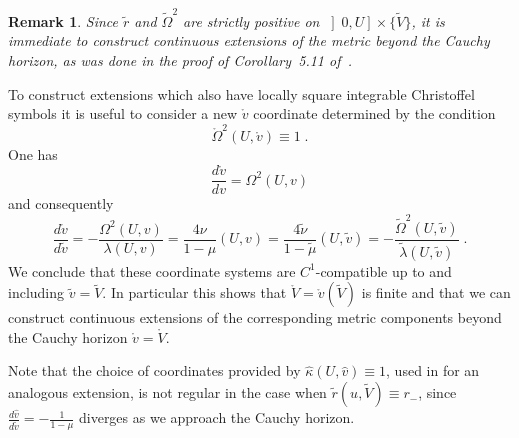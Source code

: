 \documentclass[a4paper,11pt,oneside,reqno]{amsart}
\newtheorem{Rmk}[Thm]{Remark}
\newcommand{\mv}{\mathring{v}}
\begin{document}
\begin{Rmk}
Since $\tilde r$ and $\tilde{\Omega}^2$ are strictly positive on $\left]0,U\right]\times\{\tilde V\}$, it is immediate to construct continuous extensions of the metric beyond the Cauchy horizon, as was done in the proof of\/ {\rm Corollary~5.11} of\/~{\rm \cite{relIst3}}.
\end{Rmk}


To construct extensions which also have locally square integrable Christoffel symbols it is useful to consider a new $\mathring v$ coordinate determined by the condition
\begin{equation}
\mathring \Omega^2(U,\mathring v)\equiv 1\;. 
\end{equation}
One has 
$$\frac{d \mathring v}{d v}=\Omega^2(U,v)$$
and consequently 
$$\frac{d \mathring v}{d \tilde v}=-\frac{\Omega^2(U,v)}{\lambda(U,v)}=\frac{4\nu}{1-\mu}(U,v)=\frac{4\tilde \nu}{1-\tilde \mu}(U,\tilde v)=-\frac{{\tilde\Omega}^2(U,\tilde v)}{\tilde\lambda(U,\tilde v)}\;.$$
We conclude that these coordinate systems are $C^1$-compatible up to and including $\tilde v=\tilde V$. In particular this shows that $\mathring V=\mv(\tilde V)$ is finite and that we can construct continuous extensions of the corresponding metric components beyond the Cauchy horizon $\mathring v=\mathring V$.  
 
Note that the choice of coordinates provided by $\hat \kappa (U,\hat v)\equiv 1$, used in \cite{relIst3} for an analogous extension, is not regular in the case when $\tilde r(u,\tilde V)\equiv r_-$, since $\frac{d\hat v}{d \tilde v}=-\frac1{1-\mu}$ diverges as we approach the Cauchy horizon.
\end{document}

